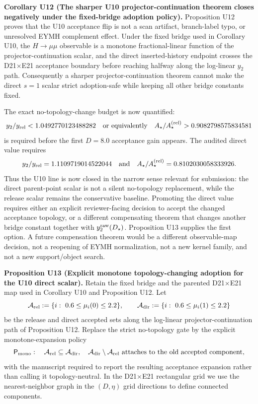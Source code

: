 \documentclass[aps,prd,onecolumn,notitlepage,nofootinbib,superscriptaddress,11pt,floatfix]{revtex4-2}
\begin{document}
\medskip\noindent\textbf{Corollary U12 (The sharper U10 projector-continuation theorem closes negatively under the fixed-bridge adoption policy).}
Proposition U12 proves that the U10 acceptance flip is not a scan artifact, branch-label typo, or unresolved EYMH complement effect.  Under the fixed bridge used in Corollary U10, the \(H\to\mu\mu\) observable is a monotone fractional-linear function of the projector-continuation scalar, and the direct inserted-history endpoint crosses the D21\(\times\)E21 acceptance boundary before reaching halfway along the log-linear \(y_2\) path.  Consequently a sharper projector-continuation theorem cannot make the direct \(s=1\) scalar strict adoption-safe while keeping all other bridge constants fixed.

The exact no-topology-change budget is now quantified:
\[
y_2/y_{\rm rel}<1.0492770123488282
\quad\text{or equivalently}\quad
A_\star/A_\star^{\rm(rel)}>0.9082798575834581
\]
is required before the first \(D=8.0\) acceptance gain appears.  The audited direct value requires
\[
y_2/y_{\rm rel}=1.1109719014522044
\quad\text{and}\quad
A_\star/A_\star^{\rm(rel)}=0.8102030058333926.
\]
Thus the U10 line is now closed in the narrow sense relevant for submission: the direct parent-point scalar is not a silent no-topology replacement, while the release scalar remains the conservative baseline.  Promoting the direct value requires either an explicit reviewer-facing decision to accept the changed acceptance topology, or a different compensating theorem that changes another bridge constant together with \(y_2^{\rm raw}(D_\star)\).  Proposition U13 supplies the first option.  A future compensation theorem would be a different observable-map decision, not a reopening of EYMH normalization, not a new kernel family, and not a new support/object search.

\medskip\noindent\textbf{Proposition U13 (Explicit monotone topology-changing adoption for the U10 direct scalar).}
Retain the fixed bridge and the parented D21\(\times\)E21 map used in Corollary U10 and Proposition U12.  Let
\[
\mathcal A_{\rm rel}:=\{i:\ 0.6\le\mu_i(0)\le2.2\},
\qquad
\mathcal A_{\rm dir}:=\{i:\ 0.6\le\mu_i(1)\le2.2\}
\]
be the release and direct accepted sets along the log-linear projector-continuation path of Proposition U12.  Replace the strict no-topology gate by the explicit monotone-expansion policy
\[
\mathsf P_{\rm mono}:
\quad
\mathcal A_{\rm rel}\subseteq\mathcal A_{\rm dir},
\quad
\mathcal A_{\rm dir}\setminus\mathcal A_{\rm rel}
\text{ attaches to the old accepted component,}
\]
with the manuscript required to report the resulting acceptance expansion rather than calling it topology-neutral.  In the D21\(\times\)E21 rectangular grid we use the nearest-neighbor graph in the \((D,\eta)\) grid directions to define connected components.
\end{document}
